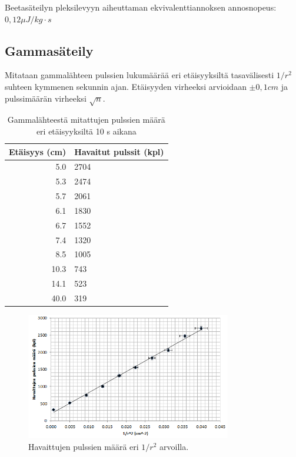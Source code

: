 \documentclass[a4paper,11pt]{article}
\begin{document}
Beetasäteilyn pleksilevyyn aiheuttaman ekvivalenttiannoksen annosnopeus: $0,12 \mu J / kg \cdot s$


\subsection{Gammasäteily}
\label{tulokset:gamma}

Mitataan gammalähteen pulssien lukumäärää eri etäisyyksiltä tasavälisesti $1/r^2$ suhteen kymmenen sekunnin ajan. Etäisyyden virheeksi arvioidaan $\pm 0,1 cm$ ja pulssimäärän virheeksi $\sqrt{n}$.

\begin{table}[H]
\begin{center}
\caption{Gammalähteestä mitattujen pulssien määrä eri etäisyyksiltä 10 s aikana}
\begin{tabular}{ | r | l | }
  \hline
Etäisyys (cm) & Havaitut pulssit (kpl) \\ \hline
5.0 & 2704 \\ \hline
5.3 & 2474 \\ \hline
5.7 & 2061 \\ \hline
6.1 & 1830 \\ \hline
6.7 & 1552 \\ \hline
7.4 & 1320 \\ \hline
8.5 & 1005 \\ \hline
10.3 & 743 \\ \hline
14.1 & 523 \\ \hline
40.0 & 319 \\ \hline
\end{tabular}
\end{center}
\end{table}

\begin{figure}[H]
\centering \includegraphics[width=0.8\textwidth]{gamma1}
\caption{Havaittujen pulssien määrä eri $1/r^2$ arvoilla. \label{gamma1}}
\end{figure}
\end{document}
